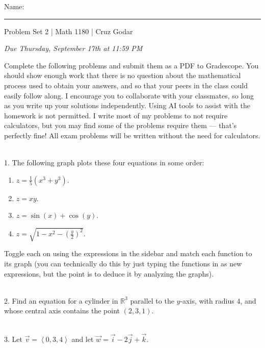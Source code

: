 \documentclass{article}
\begin{document}
\Large Name: \rule{2in}{0.15mm} \hfill Problem Set 2 | Math 1180 | Cruz Godar \vspace{4pt}  \normalsize

\textit{Due Thursday, September 17th at 11:59 PM}

Complete the following problems and submit them as a PDF to Gradescope. You should show enough work that there is no question about the mathematical process used to obtain your answers, and so that your peers in the class could easily follow along. I encourage you to collaborate with your classmates, so long as you write up your solutions independently. Using AI tools to assist with the homework is not permitted. I write most of my problems to not require calculators, but you may find some of the problems require them --- that's perfectly fine! All exam problems will be written without the need for calculators.

~\\

1. The following graph plots these four equations in some order:

\begin{enumerate}

	\item $\displaystyle z = \frac{1}{5}\left( x^3 + y^3 \right)$.

	\item $\displaystyle z = xy$.

	\item $\displaystyle z = \sin(x) + \cos(y)$.

	\item $\displaystyle z = \sqrt{1 - x^2 - \left( \frac{y}{2} \right)^2}$.

\end{enumerate}

Toggle each on using the expressions in the sidebar and match each function to its graph (you can technically do this by just typing the functions in as new expressions, but the point is to deduce it by analyzing the graphs).

~\\

2. Find an equation for a cylinder in $\mathbb{R}^3$ parallel to the $y$-axis, with radius $4$, and whose central axis contains the point $(2, 3, 1)$.

~\\

3. Let $\vec{v} = \left< 0, 3, 4 \right>$ and let $\vec{w} = \vec{i} - 2\vec{j} + \vec{k}$.
\end{document}
